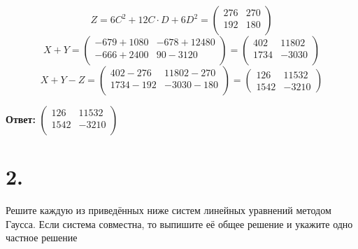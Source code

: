 \documentclass[a4paper,12pt]{article}
\begin{document}
\[
Z = 6C^2 + 12C \cdot D + 6D^2 = \begin{pmatrix}
276 & 270 \\ 192 & 180\\
\end{pmatrix}
\]
\[
X + Y = \begin{pmatrix}
-679 + 1080 & -678 + 12480 \\ -666 + 2400 & 90 - 3120\\
\end{pmatrix} = \begin{pmatrix}
402 & 11802 \\ 1734 & -3030\\
\end{pmatrix}
\]
\[
X + Y - Z = \begin{pmatrix}
402- 276 & 11802- 270 \\ 1734 - 192 & -3030 - 180\\
\end{pmatrix} = 
\begin{pmatrix}
126& 11532 \\ 1542 & -3210
\end{pmatrix}
\]
\begin{large}
\begin{center}
\textbf{Ответ:} $\begin{pmatrix}
126 & 11532\\ 1542 & -3210\\
\end{pmatrix} $
\end{center}
\end{large}
\section*{2.} 
Решите каждую из приведённых ниже систем линейных уравнений методом Гаусса. Если система совместна, то выпишите её общее решение и укажите одно частное решение
\end{document}
